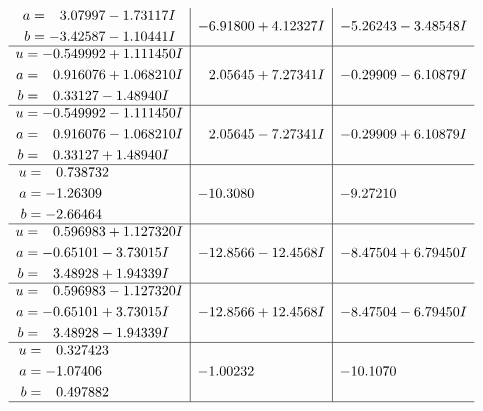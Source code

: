 \documentclass[1p]{elsarticle_modified}
\theoremstyle{definition}
\begin{document}
$$\begin{array}{c|c|c}
\begin{aligned}
a &= \phantom{-}3.07997 - 1.73117 I \\
b &= -3.42587 - 1.10441 I\end{aligned}
 & -6.91800 + 4.12327 I & -5.26243 - 3.48548 I \\ \hline\begin{aligned}
u &= -0.549992 + 1.111450 I \\
a &= \phantom{-}0.916076 + 1.068210 I \\
b &= \phantom{-}0.33127 - 1.48940 I\end{aligned}
 & \phantom{-}2.05645 + 7.27341 I & -0.29909 - 6.10879 I \\ \hline\begin{aligned}
u &= -0.549992 - 1.111450 I \\
a &= \phantom{-}0.916076 - 1.068210 I \\
b &= \phantom{-}0.33127 + 1.48940 I\end{aligned}
 & \phantom{-}2.05645 - 7.27341 I & -0.29909 + 6.10879 I \\ \hline\begin{aligned}
u &= \phantom{-}0.738732\phantom{ +0.000000I} \\
a &= -1.26309\phantom{ +0.000000I} \\
b &= -2.66464\phantom{ +0.000000I}\end{aligned}
 & -10.3080\phantom{ +0.000000I} & -9.27210\phantom{ +0.000000I} \\ \hline\begin{aligned}
u &= \phantom{-}0.596983 + 1.127320 I \\
a &= -0.65101 - 3.73015 I \\
b &= \phantom{-}3.48928 + 1.94339 I\end{aligned}
 & -12.8566 - 12.4568 I & -8.47504 + 6.79450 I \\ \hline\begin{aligned}
u &= \phantom{-}0.596983 - 1.127320 I \\
a &= -0.65101 + 3.73015 I \\
b &= \phantom{-}3.48928 - 1.94339 I\end{aligned}
 & -12.8566 + 12.4568 I & -8.47504 - 6.79450 I \\ \hline\begin{aligned}
u &= \phantom{-}0.327423\phantom{ +0.000000I} \\
a &= -1.07406\phantom{ +0.000000I} \\
b &= \phantom{-}0.497882\phantom{ +0.000000I}\end{aligned}
 & -1.00232\phantom{ +0.000000I} & -10.1070\phantom{ +0.000000I}\\
 \hline 
 \end{array}$$\newpage\newpage\renewcommand{\arraystretch}{1}
\end{document}
